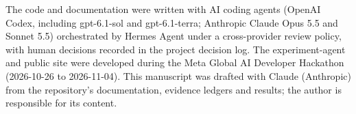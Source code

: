 \documentclass[11pt,letterpaper]{article}
\begin{document}
The code and documentation were written with AI coding agents (OpenAI Codex, including gpt-6.1-sol and gpt-6.1-terra; Anthropic Claude Opus 5.5 and Sonnet 5.5) orchestrated by Hermes Agent under a cross-provider review policy, with human decisions recorded in the project decision log. The experiment-agent and public site were developed during the Meta Global AI Developer Hackathon (2026-10-26 to 2026-11-04). This manuscript was drafted with Claude (Anthropic) from the repository's documentation, evidence ledgers and results; the author is responsible for its content.



\end{document}
